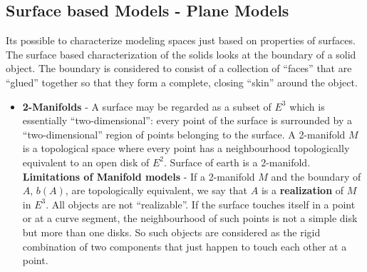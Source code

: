 \documentclass[12pt,a4paper,openbib]{article}
\begin{document}
\subsection{Surface based Models - Plane Models}
Its possible to characterize modeling spaces just based on properties of 
surfaces. The surface based characterization of the solids looks at the
boundary of a solid object. The boundary is considered to consist of a 
collection of ``faces'' that are ``glued'' together so that they form a
complete, closing ``skin'' around the object.
\begin{itemize}
	\item {\bf 2-Manifolds} - A surface may be regarded as a subset of
		$E^{3}$  which is essentially ``two-dimensional'': every point of
		the surface is surrounded by a ``two-dimensional'' region of points 
		belonging to the surface. A 2-manifold $M$ is a topological space where
		every point has a neighbourhood topologically equivalent to an open
		disk of $E^{2}$. Surface of earth is a 2-manifold.\\
		{\bf Limitations of Manifold models } - If a 2-manifold $M$ and the 
		boundary of $A$, $b(A)$, are topologically equivalent, we say that $A$ 
		is a {\bf realization} of $M$ in $E^{3}$. All objects are not 
		``realizable''.
		If the surface touches itself in a point or at a curve segment, the 
		neighbourhood of such points is not a simple disk but more than one
		disks. So such objects are considered as the rigid combination of two
		components that just happen to touch each other at a point.


\end{itemize}
\end{document}
